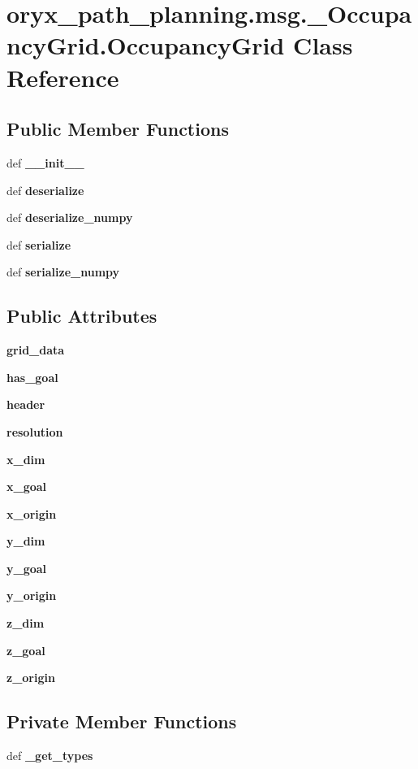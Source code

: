 \section{oryx\-\_\-path\-\_\-planning.\-msg.\-\_\-\-Occupancy\-Grid.\-Occupancy\-Grid \-Class \-Reference}
\label{classoryx__path__planning_1_1msg_1_1__OccupancyGrid_1_1OccupancyGrid}
\subsection*{\-Public \-Member \-Functions}
\begin{DoxyCompactItemize}
\item 
def {\bf \-\_\-\-\_\-init\-\_\-\-\_\-}
\item 
def {\bf deserialize}
\item 
def {\bf deserialize\-\_\-numpy}
\item 
def {\bf serialize}
\item 
def {\bf serialize\-\_\-numpy}
\end{DoxyCompactItemize}
\subsection*{\-Public \-Attributes}
\begin{DoxyCompactItemize}
\item 
{\bf grid\-\_\-data}
\item 
{\bf has\-\_\-goal}
\item 
{\bf header}
\item 
{\bf resolution}
\item 
{\bf x\-\_\-dim}
\item 
{\bf x\-\_\-goal}
\item 
{\bf x\-\_\-origin}
\item 
{\bf y\-\_\-dim}
\item 
{\bf y\-\_\-goal}
\item 
{\bf y\-\_\-origin}
\item 
{\bf z\-\_\-dim}
\item 
{\bf z\-\_\-goal}
\item 
{\bf z\-\_\-origin}
\end{DoxyCompactItemize}
\subsection*{\-Private \-Member \-Functions}
\begin{DoxyCompactItemize}
\item 
def {\bf \-\_\-get\-\_\-types}
\end{DoxyCompactItemize}
